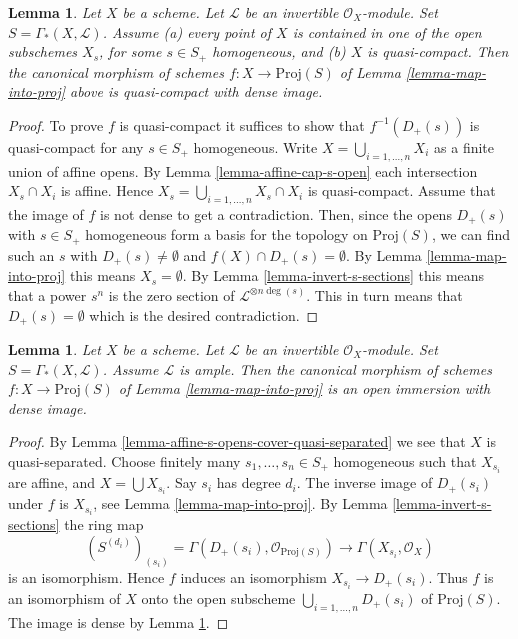 \documentclass{stacks-project}
\theoremstyle{plain}
\newtheorem{lemma}[subsection]{Lemma}
\theoremstyle{definition}
\theoremstyle{remark}
\numberwithin{equation}{subsection}
\begin{document}
\begin{lemma}
\label{lemma-map-into-proj-quasi-compact}
Let $X$ be a scheme. Let $\mathcal{L}$ be an invertible $\mathcal{O}_X$-module.
Set $S = \Gamma_*(X, \mathcal{L})$.
Assume (a) every point of $X$ is contained in one of the
open subschemes $X_s$, for some $s \in S_{+}$ homogeneous,
and (b) $X$ is quasi-compact. Then the canonical morphism of schemes
$f : X \longrightarrow \text{Proj}(S)$ of Lemma \ref{lemma-map-into-proj}
above is quasi-compact with dense image.
\end{lemma}

\begin{proof}
To prove $f$ is quasi-compact it suffices to show that $f^{-1}(D_{+}(s))$
is quasi-compact for any $s \in S_{+}$ homogeneous. Write
$X = \bigcup_{i = 1, \ldots, n} X_i$ as a finite union of
affine opens. By Lemma \ref{lemma-affine-cap-s-open} each intersection
$X_s \cap X_i$ is affine. Hence $X_s = \bigcup_{i = 1, \ldots, n} X_s \cap X_i$
is quasi-compact. Assume that the image of $f$ is not dense to get
a contradiction. Then, since the opens $D_+(s)$ with $s \in S_+$ homogeneous
form a basis for the topology on $\text{Proj}(S)$, we can find such
an $s$ with $D_+(s) \not = \emptyset$ and $f(X) \cap D_+(s) = \emptyset$.
By Lemma \ref{lemma-map-into-proj}
this means $X_s = \emptyset$. By Lemma \ref{lemma-invert-s-sections}
this means that a power $s^n$ is the zero section of
$\mathcal{L}^{\otimes n\deg(s)}$.
This in turn means that $D_+(s) = \emptyset$ which is the
desired contradiction.
\end{proof}

\begin{lemma}
\label{lemma-ample-immersion-into-proj}
Let $X$ be a scheme. Let $\mathcal{L}$ be an invertible $\mathcal{O}_X$-module.
Set $S = \Gamma_*(X, \mathcal{L})$.
Assume $\mathcal{L}$ is ample. Then the canonical morphism of schemes
$f : X \longrightarrow \text{Proj}(S)$ of Lemma \ref{lemma-map-into-proj}
is an open immersion with dense image.
\end{lemma}

\begin{proof}
By Lemma \ref{lemma-affine-s-opens-cover-quasi-separated} we see
that $X$ is quasi-separated. Choose finitely many
$s_1, \ldots, s_n \in S_{+}$ homogeneous
such that $X_{s_i}$ are affine, and $X = \bigcup X_{s_i}$.
Say $s_i$ has degree $d_i$. The inverse image of
$D_{+}(s_i)$ under $f$ is $X_{s_i}$, see Lemma \ref{lemma-map-into-proj}.
By Lemma \ref{lemma-invert-s-sections} the ring map
$$
(S^{(d_i)})_{(s_i)} = \Gamma(D_{+}(s_i), \mathcal{O}_{\text{Proj}(S)})
\longrightarrow
\Gamma(X_{s_i}, \mathcal{O}_X)
$$
is an isomorphism. Hence $f$ induces an isomorphism
$X_{s_i} \to D_{+}(s_i)$. Thus $f$ is an isomorphism of $X$ onto the open
subscheme $\bigcup_{i = 1, \ldots, n} D_{+}(s_i)$ of $\text{Proj}(S)$.
The image is dense by Lemma \ref{lemma-map-into-proj-quasi-compact}.
\end{proof}
\end{document}
